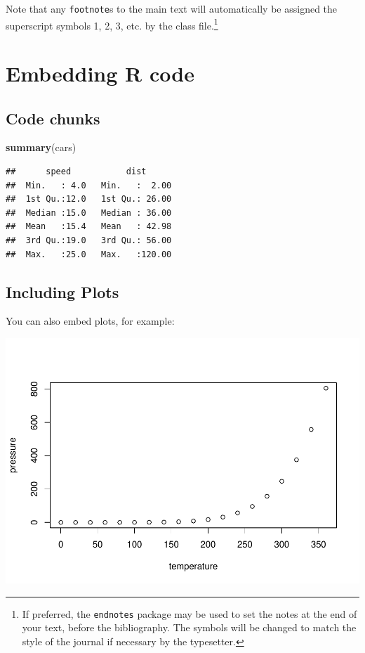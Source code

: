 \documentclass[]{interact}
\theoremstyle{plain}%
\theoremstyle{definition}
\theoremstyle{remark}
\newenvironment{Shaded}{\begin{snugshade}}{\end{snugshade}}
\newcommand{\KeywordTok}[1]{\textcolor[rgb]{0.13,0.29,0.53}{\textbf{#1}}}
\newcommand{\NormalTok}[1]{#1}
\begin{document}
Note that any \texttt{footnote}s to the main text will automatically be
assigned the superscript symbols 1, 2, 3, etc. by the class
file.\footnote{If preferred, the \texttt{endnotes} package may be used
  to set the notes at the end of your text, before the bibliography. The
  symbols will be changed to match the style of the journal if necessary
  by the typesetter.}

\hypertarget{embedding-r-code}{%
\section{Embedding R code}\label{embedding-r-code}}

\hypertarget{code-chunks}{%
\subsection{Code chunks}\label{code-chunks}}

\begin{Shaded}
\begin{Highlighting}[]
\KeywordTok{summary}\NormalTok{(cars)}
\end{Highlighting}
\end{Shaded}

\begin{verbatim}
##      speed           dist       
##  Min.   : 4.0   Min.   :  2.00  
##  1st Qu.:12.0   1st Qu.: 26.00  
##  Median :15.0   Median : 36.00  
##  Mean   :15.4   Mean   : 42.98  
##  3rd Qu.:19.0   3rd Qu.: 56.00  
##  Max.   :25.0   Max.   :120.00
\end{verbatim}

\hypertarget{including-plots}{%
\subsection{Including Plots}\label{including-plots}}

You can also embed plots, for example:

\includegraphics[width=0.8\linewidth]{project-plan_files/figure-latex/pressure-1}
\end{document}
